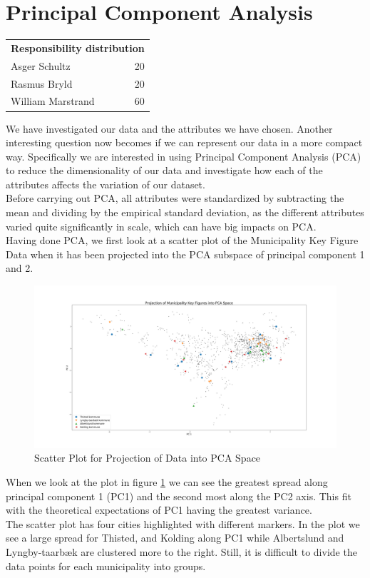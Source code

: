 \documentclass[11pt,fleqn]{article}
\newcommand{\respdist}[3]{
	\vspace*{-.5cm}
	\begin{table}[H]
	\small
		\begin{tabular}{l r}
			\multicolumn{2}{l}{\textbf{Responsibility distribution}}	\\
			Asger Schultz&	#1\pro\\
			Rasmus Bryld&	#2\pro\\
			William Marstrand&#3\pro
		\end{tabular}
	\end{table}
	\vspace*{-.3cm}
}
\numberwithin{footnote}{section}
\numberwithin{figure}{section}
\numberwithin{table}{section}
\begin{document}
\section{Principal Component Analysis}
\respdist{20}{20}{60}
We have investigated our data and the attributes we have chosen.
Another interesting question now becomes if we can represent our data in a more compact way.
Specifically we are interested in using Principal Component Analysis (PCA) to reduce the dimensionality of our data and investigate how each of the attributes affects the variation of our dataset.\\
Before carrying out PCA, all attributes were standardized by subtracting the mean and dividing by the empirical standard deviation, as the different attributes varied quite significantly in scale, which can have big impacts on PCA.
\\
Having done PCA, we first look at a scatter plot of the Municipality Key Figure Data when it has been projected into the PCA subspace of principal component 1 and 2.
\begin{figure}[H]
	\centering
	\includegraphics[width=\textwidth]{PCA_scatter}
	\caption{Scatter Plot for Projection of Data into PCA Space}
	\label{scatter}
\end{figure}\noindent
When we look at the plot in figure \ref{scatter} we can see the greatest spread along principal component 1 (PC1) and the second most along the PC2 axis. This fit with the theoretical expectations of PC1 having the greatest variance.\\
The scatter plot has four cities highlighted with different markers. In the plot we see a large spread for Thisted, and Kolding along PC1 while Albertslund and Lyngby-taarbæk are clustered more to the right. Still, it is difficult to divide the data points for each municipality into groups.\\
\end{document}

